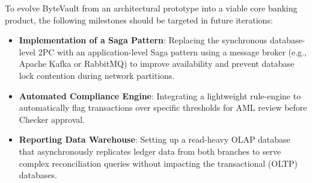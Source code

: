 To evolve ByteVault from an architectural prototype into a viable core banking product, the following milestones should be targeted in future iterations:

\begin{itemize}
    \item \textbf{Implementation of a Saga Pattern}: Replacing the synchronous database-level 2PC with an application-level Saga pattern using a message broker (e.g., Apache Kafka or RabbitMQ) to improve availability and prevent database lock contention during network partitions.
    \item \textbf{Automated Compliance Engine}: Integrating a lightweight rule-engine to automatically flag transactions over specific thresholds for AML review before Checker approval.
    \item \textbf{Reporting Data Warehouse}: Setting up a read-heavy OLAP database that asynchronously replicates ledger data from both branches to serve complex reconciliation queries without impacting the transactional (OLTP) databases.
\end{itemize}
